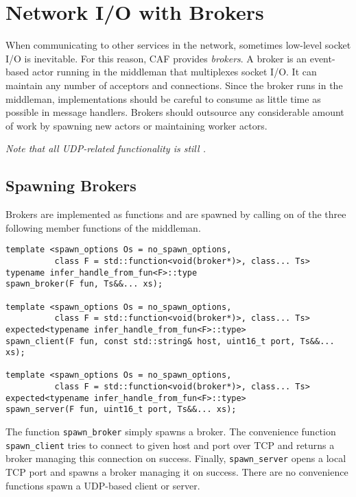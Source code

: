 \section{Network I/O with Brokers}
\label{broker}

When communicating to other services in the network, sometimes low-level socket
I/O is inevitable. For this reason, CAF provides \emph{brokers}. A broker is
an event-based actor running in the middleman that multiplexes socket I/O. It
can maintain any number of acceptors and connections. Since the broker runs in
the middleman, implementations should be careful to consume as little time as
possible in message handlers. Brokers should outsource any considerable amount
of work by spawning new actors or maintaining worker actors.

\textit{Note that all UDP-related functionality is still \experimental.}

\subsection{Spawning Brokers}

Brokers are implemented as functions and are spawned by calling on of the three
following member functions of the middleman.

\begin{lstlisting}
template <spawn_options Os = no_spawn_options,
          class F = std::function<void(broker*)>, class... Ts>
typename infer_handle_from_fun<F>::type
spawn_broker(F fun, Ts&&... xs);

template <spawn_options Os = no_spawn_options,
          class F = std::function<void(broker*)>, class... Ts>
expected<typename infer_handle_from_fun<F>::type>
spawn_client(F fun, const std::string& host, uint16_t port, Ts&&... xs);

template <spawn_options Os = no_spawn_options,
          class F = std::function<void(broker*)>, class... Ts>
expected<typename infer_handle_from_fun<F>::type>
spawn_server(F fun, uint16_t port, Ts&&... xs);
\end{lstlisting}

The function \lstinline^spawn_broker^ simply spawns a broker. The convenience
function \lstinline^spawn_client^ tries to connect to given host and port over
TCP and returns a broker managing this connection on success. Finally,
\lstinline^spawn_server^ opens a local TCP port and spawns a broker managing it
on success. There are no convenience functions spawn a UDP-based client or
server.

